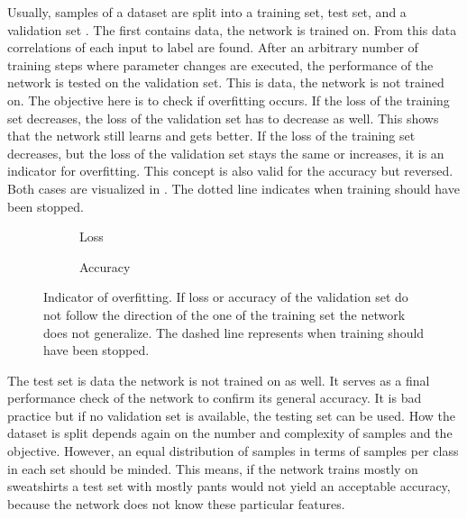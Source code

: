 Usually, samples of a dataset are split into a training set, test set, and a validation set \cite{James2014}.
The first contains data, the network is trained on.
From this data correlations of each input to label are found.
After an arbitrary number of training steps where parameter changes are executed, the performance of the network is tested on the validation set.
This is data, the network is not trained on.
The objective here is to check if overfitting occurs.
If the loss of the training set decreases, the loss of the validation set has to decrease as well.
This shows that the network still learns and gets better.
If the loss of the training set decreases, but the loss of the validation set stays the same or increases, it is an indicator for overfitting.
This concept is also valid for the accuracy but reversed.
Both cases are visualized in .
The dotted line indicates when training should have been stopped.
\begin{figure}
	\setlength{}
	\setlength{}
	\centering
	\begin{subfigure}{.5\textwidth}
		
		\caption[Loss]{Loss}
	\end{subfigure}%
	\begin{subfigure}{.5\textwidth}
		
		\caption[Accuracy]{Accuracy}
	\end{subfigure}
	\caption[Indicator of overfitting]{Indicator of overfitting. If loss or accuracy of the validation set do not follow the direction of the one of the training set the network does not generalize. The dashed line represents when training should have been stopped.}
	\label{fig:overfitting}
\end{figure}

The test set is data the network is not trained on as well.
It serves as a final performance check of the network to confirm its general accuracy.
It is bad practice but if no validation set is available, the testing set can be used.
How the dataset is split depends again on the number and complexity of samples and the objective.
However, an equal distribution of samples in terms of samples per class in each set should be minded.
This means, if the network trains mostly on sweatshirts a test set with mostly pants would not yield an acceptable accuracy, because the network does not know these particular features.

